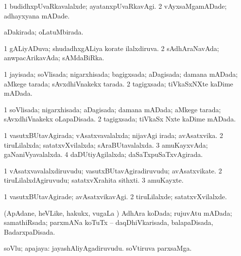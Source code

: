 \bentry
{} 
\gl{\kirxvi}
\bmng
\bnum
\num{1} budidhxpUvaRkavalalxde; ayatanxpUvaRkavAgi. 
\num{2} vAyxsaMgamADade; adhayxyana mADade. 
\enum
\emng
\eentry

\bentry
{} 
\gl{\gu}
\expl{}
\bmng
aDakirada; oLatuMbirada. 
\emng
\eentry

\bentry
{} 
\gl{\gu}
\expl{}
\bmng
\bnum
\num{1} gALiyADuva; shudadhxgALiya korate ilalxdiruva. 
\num{2} sAdhAraNavAda; anwpacArikavAda; sAMdaBiRka. 
\enum
\emng
\eentry

\bentry
{} 
\gl{\gu}
\expl{}
\bmng
\bnum
\num{1} jayisada; soVlisada; nigarxhisada; bagigxsada; aDagisada; damana mADada; aMkege tarada; sAvxdhiVnakekx tarada. 
\num{2} tagigxsada; tiVkaSxNXte kaDime mADada. 
\enum
\emng
\eentry

\bentry
{} 
\gl{\gu}
\expl{}
\bmng
\bnum
\num{1} soVlisada; nigarxhisada; aDagisada; damana mADada; aMkege tarada; sAvxdhiVnakekx oLapaDisada. 
\num{2} tagigxsada; tiVkaSx Nxte kaDime mADada. 
\enum
\emng
\eentry

\bentry
{} 
\gl{\gu}
\expl{}
\bmng
\bnum
\num{1} vasutxBUtavAgirada; vAsatxvavalalxda; nijavAgi irada; avAsatxvika. 
\num{2} tiruLilalxda; satatxvXvilalxda; sAraBUtavalalxda. 
\num{3} amuKayxvAda; gaNaniVyavalalxda. 
\num{4} daDUtiyAgilalxda; daSaTxpuSaTxvAgirada. 
\enum
\emng
\eentry

\bentry
{} 
\gl{\nA}
\expl{}
\bmng
\bnum
\num{1} vAsatxvavalalxdiruvudu; vasutxBUtavAgiradiruvudu; avAsatxvikate. 
\num{2} tiruLilalxdAgiruvudu; satatxvXrahita sithxti. 
\num{3} amuKayxte. 
\enum
\emng
\eentry

\bentry
{} 
\gl{\kirxvi}
\expl{}
\bmng
\bnum
\num{1} vasutxBUtavAgirade; avAsatxvikavAgi. 
\num{2} tiruLilalxde; satatxvXvilalxde. 
\enum
\emng
\eentry

\bentry
{} 
\gl{\gu}
\expl{}
\bmng
(ApAdane, heVLike, hakukx, \mo vugaLa \vi) AdhAra koDada; rujuvAtu mADada; samathiRsada; parxmANa koTuTx -- daqDhiVkarisada, balapaDisada, BadarxpaDisada. 
\emng
\eentry

\bentry
{} 
\gl{\nA}
\expl{}
\bmng
soVlu; apajaya: 
\banum
{} jayashAliyAgadiruvudu. 
 soVtiruva parxsaMga. 
\eanum
\emng
\eentry

